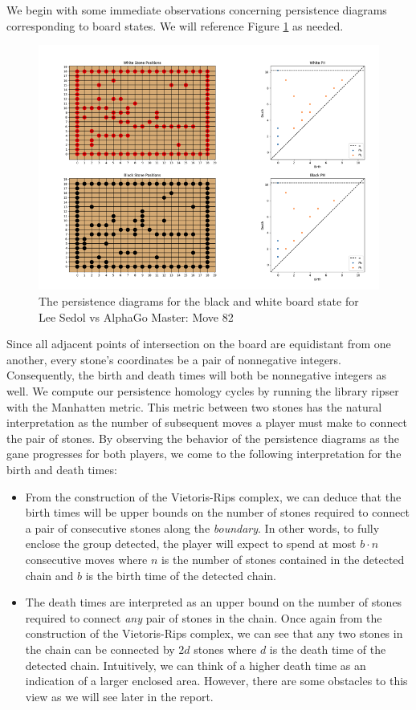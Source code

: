 \documentclass[11pt]{article}
\begin{document}
We begin with some immediate observations concerning persistence diagrams corresponding to board states. We will reference Figure \ref{fig:lsd1} as needed.
\begin{figure}[ht]
  \centering
  \includegraphics{lsd1.png}
  \caption{The persistence diagrams for the black and white board state for Lee Sedol vs AlphaGo Master: Move 82}
  \label{fig:lsd1}
\end{figure}

Since all adjacent points of intersection on the board are equidistant from one another, every stone's coordinates be a pair of nonnegative integers. Consequently, the birth and death times will both be nonnegative integers as well. We compute our persistence homology cycles by running the library ripser with the Manhatten metric. This metric between two stones has the natural interpretation as the number of subsequent moves a player must make to connect the pair of stones. By observing the behavior of the persistence diagrams as the gane progresses for both players, we come to the following interpretation for the birth and death times:
\begin{itemize}
  \item From the construction of the Vietoris-Rips complex, we can deduce that the birth times will be upper bounds on the number of stones required to connect a pair of consecutive stones along the \textit{boundary}. In other words, to fully enclose the group detected, the player will expect to spend at most $b\cdot n$ consecutive moves where $n$ is the number of stones contained in the detected chain and $b$ is the birth time of the detected chain.
  \item The death times are interpreted as an upper bound on the number of stones required to connect \textit{any} pair of stones in the chain. Once again from the construction of the Vietoris-Rips complex, we can see that any two stones in the chain can be connected by $2d$ stones where $d$ is the death time of the detected chain. Intuitively, we can think of a higher death time as an indication of a larger enclosed area. However, there are some obstacles to this view as we will see later in the report.
\end{itemize}
\end{document}
